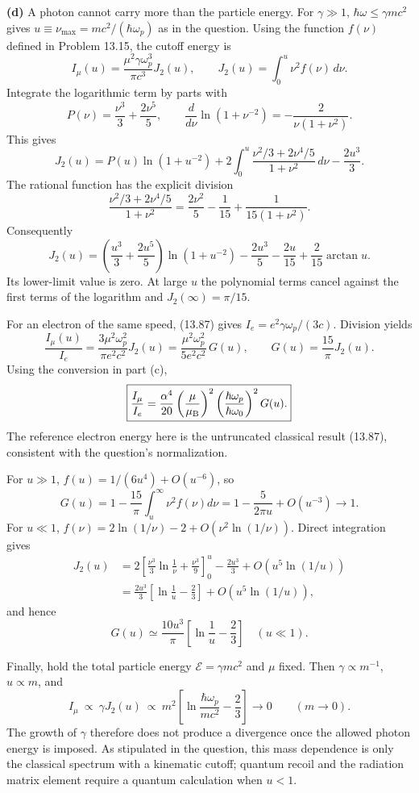 \textbf{(d)} A photon cannot carry more than the particle energy.
For $\gamma\gg1$, $\hbar\omega\leq\gamma mc^2$ gives
$u\equiv\nu_{\max}=mc^2/(\hbar\omega_p)$ as in the question.
Using the function $f(\nu)$ defined in Problem 13.15, the cutoff energy is
\[
 I_\mu(u)=\frac{\mu^2\gamma\omega_p^3}{\pi c^3}J_2(u),
 \qquad J_2(u)=\int_0^u\nu^2f(\nu)\,d\nu.
\]
Integrate the logarithmic term by parts with
\[
 P(\nu)=\frac{\nu^3}{3}+\frac{2\nu^5}{5},\qquad
 \frac{d}{d\nu}\ln(1+\nu^{-2})=-\frac{2}{\nu(1+\nu^2)}.
\]
This gives
\[
 J_2(u)=P(u)\ln(1+u^{-2})
 +2\int_0^u\frac{\nu^2/3+2\nu^4/5}{1+\nu^2}\,d\nu
 -\frac{2u^3}{3}.
\]
The rational function has the explicit division
\[
 \frac{\nu^2/3+2\nu^4/5}{1+\nu^2}
 =\frac{2\nu^2}{5}-\frac1{15}
       +\frac1{15(1+\nu^2)}.
\]
Consequently
\[
 \boxed{J_2(u)=
 \left(\frac{u^3}{3}+\frac{2u^5}{5}\right)\ln(1+u^{-2})
 -\frac{2u^3}{5}-\frac{2u}{15}+\frac{2}{15}\arctan u.}
\]
Its lower-limit value is zero. At large $u$ the polynomial terms
cancel against the first terms of the logarithm and
$J_2(\infty)=\pi/15$.

For an electron of the same speed, (13.87) gives
$I_e=e^2\gamma\omega_p/(3c)$. Division yields
\[
 \frac{I_\mu(u)}{I_e}
 =\frac{3\mu^2\omega_p^2}{\pi e^2c^2}J_2(u)
 =\frac{\mu^2\omega_p^2}{5e^2c^2}\,G(u),
 \qquad
 \boxed{G(u)=\frac{15}{\pi}J_2(u).}
\]
Using the conversion in part (c),
\[
 \boxed{\frac{I_\mu}{I_e}
 =\frac{\alpha^4}{20}\left(\frac{\mu}{\mu_{\rm B}}\right)^2
  \left(\frac{\hbar\omega_p}{\hbar\omega_0}\right)^2G(u).}
\]
The reference electron energy here is the untruncated classical result
(13.87), consistent with the question's normalization.

For $u\gg1$, $f(u)=1/(6u^4)+O(u^{-6})$, so
\[
 G(u)=1-\frac{15}{\pi}\int_u^\infty\nu^2f(\nu)d\nu
     =1-\frac{5}{2\pi u}+O(u^{-3})\longrightarrow1.
\]
For $u\ll1$,
$f(\nu)=2\ln(1/\nu)-2+O(\nu^2\ln(1/\nu))$. Direct integration gives
\[
 \begin{split}
 J_2(u)
 &=2\left[\frac{\nu^3}{3}\ln\frac1\nu
                       +\frac{\nu^3}{9}\right]_0^u
   -\frac{2u^3}{3}+O(u^5\ln(1/u))\\
 &=\frac{2u^3}{3}
       \left[\ln\frac1u-\frac23\right]+O(u^5\ln(1/u)),
 \end{split}
\]
and hence
\[
 \boxed{G(u)\simeq\frac{10u^3}{\pi}
       \left[\ln\frac1u-\frac23\right]\quad(u\ll1).}
\]

Finally, hold the total particle energy $\mathcal E=\gamma mc^2$ and
$\mu$ fixed. Then $\gamma\propto m^{-1}$, $u\propto m$, and
\[
 I_\mu\ \propto\ \gamma J_2(u)
 \ \propto\ m^2\left[
 \ln\frac{\hbar\omega_p}{mc^2}-\frac23\right]
 \longrightarrow0\qquad(m\to0).
\]
The growth of $\gamma$ therefore does not produce a divergence once
the allowed photon energy is imposed. As stipulated in the question,
this mass dependence is only the classical spectrum with a kinematic
cutoff; quantum recoil and the radiation matrix element require a
quantum calculation when $u<1$.
